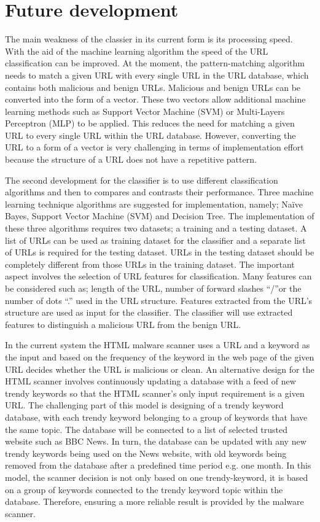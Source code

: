 \section{Future development}

The main weakness of the classier in its current form is its processing speed. With the aid of the machine learning algorithm the speed of the URL classification can be improved. At the moment, the pattern-matching algorithm needs to match a given URL with every single URL in the URL database, which contains both malicious and benign URLs. Malicious and benign URLs can be converted into the form of a vector. These two vectors allow additional machine learning methods such as Support Vector Machine (SVM) or Multi-Layers Perceptron (MLP) to be applied. This reduces the need for matching a given URL to every single URL within the URL database. However, converting the URL to a form of a vector is very challenging in terms of implementation effort because the structure of a URL does not have a repetitive pattern.

The second development for the classifier is to use different classification algorithms and then to compares and contrasts their performance. Three machine learning technique algorithms are suggested for implementation, namely; Naïve Bayes, Support Vector Machine (SVM) and Decision Tree. The implementation of these three algorithms requires two datasets; a training and a testing dataset. A list of URLs can be used as training dataset for the classifier and a separate list of URLs is required for the testing dataset. URLs in the testing dataset should be completely different from those URLs in the training dataset. The important aspect involves the selection of URL features for classification. Many features can be considered such as; length of the URL, number of forward slashes “/”or the number of dots “.” used in the URL structure. Features extracted from the URL’s structure are used as input for the classifier. The classifier will use extracted features to distinguish a malicious URL from the benign URL. 

In the current system the HTML malware scanner uses a URL and a keyword as the input and based on the frequency of the keyword in the web page of the given URL decides whether the URL is malicious or clean. An alternative design for the HTML scanner involves continuously updating a database with a feed of new trendy keywords so that the HTML scanner’s only input requirement is a given URL. The challenging part of this model is designing of a trendy keyword database, with each trendy keyword belonging to a group of keywords that have the same topic. The database will be connected to a list of selected trusted website such as BBC News. In turn, the database can be updated with any new trendy keywords being used on the News website, with old keywords being removed from the database after a predefined time period e.g. one month. In this model, the scanner decision is not only based on one trendy-keyword, it is based on a group of keywords connected to the trendy keyword topic within the database. Therefore, ensuring a more reliable result is provided by the malware scanner.

